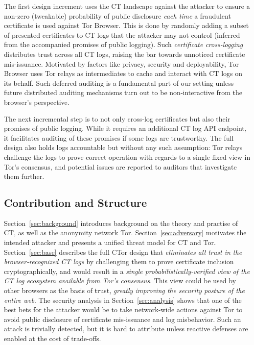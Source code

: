 The first design increment uses the CT landscape against the attacker to
ensure a non-zero (tweakable) probability of public disclosure \emph{each time}
a fraudulent certificate is used against Tor Browser.  This is done by randomly
adding a subset of presented certificates to CT logs that the attacker may not
control (inferred from the accompanied promises of public logging).  Such
\emph{certificate cross-logging} distributes trust across all CT logs, raising
the bar towards unnoticed certificate mis-issuance.  Motivated by factors like
privacy, security and deployability, Tor Browser uses Tor relays as
intermediates to cache and interact with CT logs on its behalf.  Such deferred
auditing is a fundamental part of our setting unless future distributed auditing
mechanisms turn out to be non-interactive from the browser's perspective.

The next incremental step is to not only cross-log certificates but also their
promises of public logging.  While it requires an additional CT log API
endpoint, it facilitates auditing of these promises if some logs are
trustworthy.  The full design also holds logs accountable but without any such
assumption:
	Tor relays challenge the logs to prove correct operation with regards to a
		single fixed view in Tor's consensus, and
	potential issues are reported to auditors that investigate them further.

\subsection{Contribution and Structure}
Section~\ref{sec:background} introduces background on the theory and practise of
CT, as well as the anonymity network Tor.  Section~\ref{sec:adversary} motivates
the intended attacker and presents a unified threat model for CT and Tor.
Section~\ref{sec:base} describes the full CTor design that \emph{eliminates all
trust in the browser-recognized CT logs} by challenging them to prove
certificate inclusion cryptographically, and would result in a \emph{single
probabilistically-verified view of the CT log ecosystem available from Tor's
consensus}.  This view could be used by other browsers as the basis of trust,
\emph{greatly improving the security posture of the entire web}.  The security
analysis in Section~\ref{sec:analysis} shows that one of the best bets for the
attacker would be to take network-wide actions against Tor to avoid public
disclosure of certificate mis-issuance and log misbehavior.  Such an attack is
trivially detected, but it is hard to attribute unless reactive defenses are
enabled at the cost of trade-offs.

